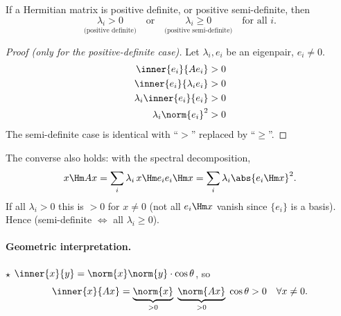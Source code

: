 \begin{theorem}
If a Hermitian matrix is positive definite, or positive semi-definite, then
\[
\underset{\text{(positive definite)}}{\lambda_i > 0} \quad\text{or}\quad \underset{\text{(positive semi-definite)}}{\lambda_i \geq 0} \quad\text{for all } i.
\]
\end{theorem}
\begin{proof}[Proof (only for the positive-definite case)]
Let $\lambda_i, e_i$ be an eigenpair, $e_i\neq 0$.
\begin{align*}
\inner{e_i}{Ae_i} &> 0\\
\inner{e_i}{\lambda_i e_i} &> 0\\
\lambda_i\inner{e_i}{e_i} &> 0\\
\lambda_i\norm{e_i}^2 &> 0
\end{align*}
The semi-definite case is identical with ``$>$'' replaced by ``$\geq$''.
\end{proof}
\begin{insight}[Converse]
The converse also holds: with the spectral decomposition,
\[
x\Hm Ax = \sum_i \lambda_i\, x\Hm e_ie_i\Hm x = \sum_i\lambda_i\abs{e_i\Hm x}^2 .
\]
If all $\lambda_i>0$ this is $>0$ for $x\neq0$ (not all $e_i\Hm x$ vanish since $\{e_i\}$ is a basis). Hence  (semi-definite $\iff$ all $\lambda_i\geq0$).
\end{insight}

\paragraph{Geometric interpretation.} $\star$ $\inner{x}{y} = \norm{x}\norm{y}\cdot\cos\theta$, so
\[
\inner{x}{Ax} = \underbrace{\norm{x}}_{>0}\;\underbrace{\norm{Ax}}_{>0}\;\cos\theta > 0 \quad \forall x\neq 0 .
\]
\begin{center}
\end{center}

